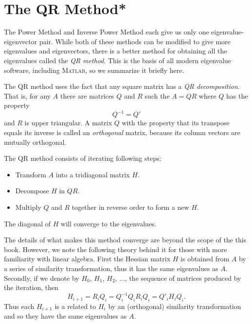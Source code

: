 \chapter{The QR Method*}

The Power Method and Inverse Power Method each give us
only one eigenvalue-eigenvector pair. While both of these methods can
be modified to give more eigenvalues and eigenvectors, there is
a better method for obtaining all the eigenvalues called
the {\em QR method}. This is the basis of all modern
eigenvalue software, including \textsc{Matlab}, so we summarize
it briefly here.

The QR method uses the fact that any square matrix has a
{\em QR decomposition}. That is, for any $A$ there are
matrices $Q$ and $R$ such the $A = QR$ where $Q$ has the property
$$
     Q^{-1} = Q'
$$
and $R$ is upper triangular. A matrix $Q$ with the property that its
transpose equals its inverse is called an {\em orthogonal} matrix,
because its column vectors are mutually orthogonal.

The QR method consists of iterating following steps:
\begin{itemize}
\item Transform $A$ into a tridiagonal matrix $H$.
\item Decompose $H$ in $QR$.
\item Multiply $Q$ and $R$ together in reverse order to form a new $H$.   
\end{itemize}
The diagonal of $H$ will converge to the eigenvalues.

The details of what makes this method converge are beyond the scope of the this book.
However, we note the following theory behind it for those with more familiarity with
linear algebra. First the Hessian matrix $H$ is
obtained from $A$ by a series of similarity transformation, thus it has the
same eigenvalues as $A$. Secondly, if we denote by $H_0$, $H_1$, $H_2$, $\ldots$, the
sequence of matrices produced by the iteration, then
$$
   H_{i+1} = R_i Q_i = Q_i^{-1} Q_i R_i Q_i = Q'_i H_i Q_i.
$$
Thus each $H_{i+1}$ is a related to $H_i$ by an (orthogonal) similarity transformation and
so they have the same eigenvalues as $A$.

